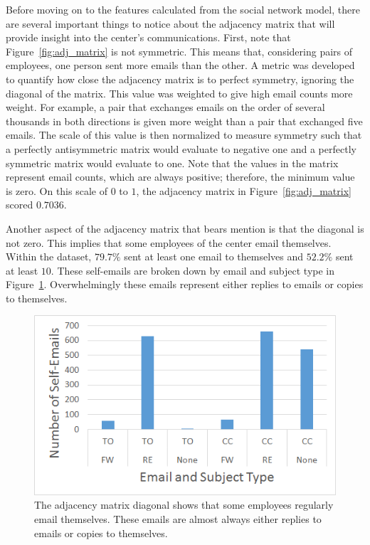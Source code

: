 \documentclass[12pt]{report}
\begin{document}
Before moving on to the features calculated from the social network model, there are several important things to notice about the adjacency matrix that will provide insight into the center's communications.
First, note that Figure~\ref{fig:adj_matrix} is not symmetric.
This means that, considering pairs of employees, one person sent more emails than the other.
A metric was developed to quantify how close the adjacency matrix is to perfect symmetry, ignoring the diagonal of the matrix.
This value was weighted to give high email counts more weight.
For example, a pair that exchanges emails on the order of several thousands in both directions is given more weight than a pair that exchanged five emails.
The scale of this value is then normalized to measure symmetry such that a perfectly antisymmetric matrix would evaluate to negative one and a perfectly symmetric matrix would evaluate to one.
Note that the values in the matrix represent email counts, which are always positive; therefore, the minimum value is zero.
On this scale of $0$ to $1$, the adjacency matrix in Figure~\ref{fig:adj_matrix} scored $0.7036$.

Another aspect of the adjacency matrix that bears mention is that the diagonal is not zero.
This implies that some employees of the center email themselves.
Within the dataset, $79.7\%$ sent at least one email to themselves and $52.2\%$ sent at least $10$.
These self-emails are broken down by email and subject type in Figure~\ref{fig:self-emails}.
Overwhelmingly these emails represent either replies to emails or copies to themselves.

\begin{figure}[t]
	\centering
	\includegraphics[width=0.7\columnwidth,trim={2mm 1mm 2mm 2mm},clip]{Self-emails_bar}
	\vspace{-17pt}
	\caption[Types of emails employees sent to themselves]{The adjacency matrix diagonal shows that some employees regularly email themselves.  These emails are almost always either replies to emails or copies to themselves.}
	\label{fig:self-emails}
\end{figure}
\end{document}
